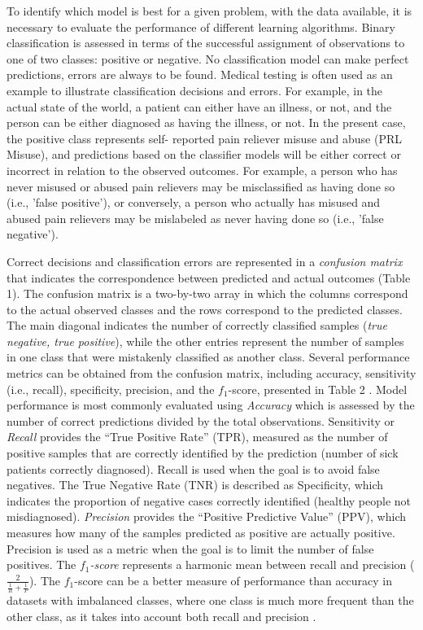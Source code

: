 \documentclass[sigconf]{acmart}
\begin{document}
To identify which model is best for a given problem, with the data available, 
it is necessary to evaluate the performance of different learning algorithms. 
Binary classification is assessed in terms of the successful assignment of 
observations to one of two classes: positive or negative. No classification 
model can make perfect predictions, errors are always to be found. Medical 
testing is often used as an example to illustrate classification decisions 
and errors. For example, in the actual state of the world, a patient can either 
have an illness, or not, and the person can be either diagnosed as having the 
illness, or not. In the present case, the positive class represents self-
reported pain reliever misuse and abuse (PRL Misuse), and predictions based on 
the classifier models will be either correct or incorrect in relation to the 
observed outcomes. For example, a person who has never misused or abused pain 
relievers may be misclassified as having done so (i.e., 'false positive'), or conversely, a person who actually has misused and abused pain relievers may 
be mislabeled as never having done so (i.e., 'false negative').


Correct decisions and classification errors are represented in a 
\emph{confusion matrix} that indicates the correspondence between predicted 
and actual outcomes (Table 1). The confusion matrix is a two-by-two array in 
which the columns correspond to the actual observed classes and the rows 
correspond to the predicted classes. The main diagonal indicates the number 
of correctly classified samples (\emph{true negative, true positive}), while 
the other entries represent the number of samples in one class that were 
mistakenly classified as another class. Several performance metrics can be 
obtained from the confusion matrix, including accuracy, sensitivity (i.e., 
recall), specificity, precision, and the $f_1$-score, presented in Table 2 
\cite{kuhn13, wiki18}. Model performance is most commonly evaluated using 
\emph{Accuracy} which is assessed by the number of correct predictions 
divided by the total observations. Sensitivity or \emph{Recall} provides the 
``True Positive Rate'' (TPR), measured as the number of positive samples that 
are correctly identified by the prediction (number of sick patients correctly
diagnosed). Recall is used when the goal is to avoid false negatives. The 
True Negative Rate (TNR) is described as Specificity, which indicates the 
proportion of negative cases correctly identified (healthy people not 
misdiagnosed). \emph{Precision} provides the ``Positive Predictive Value'' 
(PPV), which measures how many of the samples predicted as positive are 
actually positive. Precision is used as a metric when the goal is to limit
the number of false positives. The \emph{$f_1$-score} represents a harmonic 
mean between recall and precision (\(\frac{2}{ \frac{1}{R} + \frac{1}{P} }\)). 
The $f_1$-score can be a better measure of performance than accuracy in 
datasets with imbalanced classes, where one class is much more frequent 
than the other class, as it takes into account both recall and precision 
\cite{muller17, yun09}.
\end{document}
